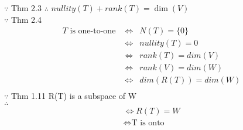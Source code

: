 $\because$ Thm 2.3 $\therefore$ $nullity(T)+ rank(T)=\dim(V)$ \\
$\because$ Thm 2.4 \\

\begin{eqnarray*}
	T \text{ is one-to-one } 
	&\iff& N(T)=\{0\} \\
	&\iff& nullity(T)=0 \\
	&\iff& rank(T)=dim(V) \\
	&\iff& rank(V)=dim(W) \\
	&\iff& dim(R(T))=dim(W) \\
\end{eqnarray*}
$\because$ Thm 1.11 R(T) is a subspace of W  \\ 
$\therefore$ 
\begin{eqnarray*}
	&\iff R(T)=W & \\
	&\iff \text{T is onto} &
\end{eqnarray*}


